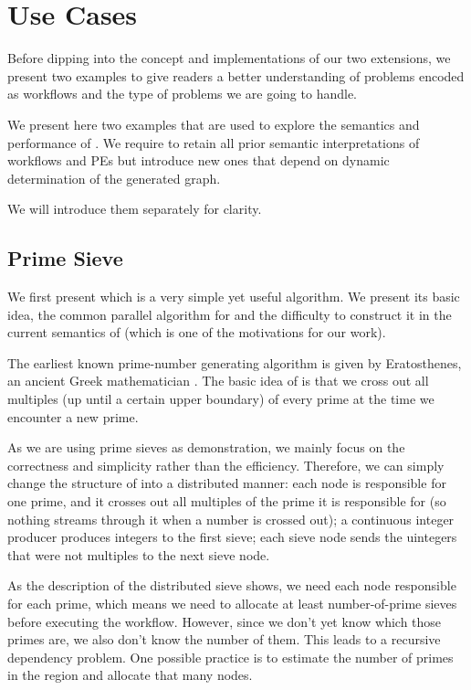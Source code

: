 \chapter{Use Cases}
Before dipping into the concept and implementations of our two extensions, we present two examples to give readers a better understanding of problems encoded as workflows and the type of problems we are going to handle.

We present here two examples that are used to explore the semantics and performance of \dpy. We require to retain all prior semantic interpretations of workflows and PEs but introduce new ones that depend on dynamic determination of the generated graph.

We will introduce them separately for clarity.

\section{Prime Sieve} \label{sec:uc_sieve}
We first present \ttsieve which is a very simple yet useful algorithm. We present its basic idea, the common parallel algorithm for \ttsieve and the difficulty to construct it in the current semantics of \dpy (which is one of the motivations for our work).

The earliest known prime-number generating algorithm is \ttesieve given by Eratosthenes, an ancient Greek mathematician \cite{o2009genuine}. The basic idea of \ttesieve is that we cross out all multiples (up until a certain upper boundary) of every prime at the time we encounter a new prime.

As we are using prime sieves as demonstration, we mainly focus on the correctness and simplicity rather than the efficiency. Therefore, we can simply change the structure of \ttesieve into a distributed manner: each node is responsible for one prime, and it crosses out all multiples of the prime it is responsible for (so nothing streams through it when a number is crossed out); a continuous integer producer produces integers to the first sieve; each sieve node sends the uintegers that were not multiples to the next sieve node.

As the description of the distributed sieve shows, we need each node responsible for each prime, which means we need to allocate at least number-of-prime sieves before executing the workflow. However, since we don't yet know which those primes are, we also don't know the number of them. This leads to a recursive dependency problem. One possible practice is to estimate the number of primes in the region and allocate that many nodes.

